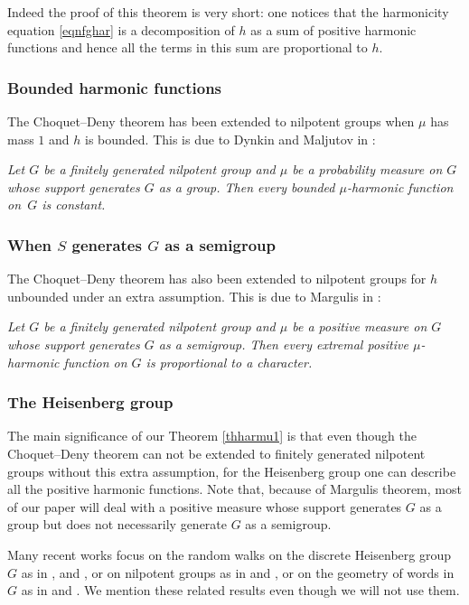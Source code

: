 Indeed the proof of this theorem is very short:
one notices that the harmonicity equation \eqref{eqnfghar}
is a decomposition of $h$ as a sum of positive harmonic functions
and hence all the terms in this sum are proportional to $h$.

\subsubsection{Bounded harmonic functions}
The Choquet--Deny theorem has been extended to nilpotent
groups when $\mu$ has mass $1$
and $h$ is bounded. This is due to
Dynkin and Maljutov in \cite{DynkinMaljutov61}:

\emph{Let $G$ be a finitely generated nilpotent group
and $\mu$ be a probability measure on $G$
whose support generates $G$ as a group.
Then every bounded $\mu$-harmonic
function on~$G$ is constant.}

\subsubsection{When $S$ generates $G$ as a semigroup}
The Choquet--Deny theorem has also been extended to nilpotent
groups for $h$ unbounded under an extra assumption.
This is due to Margulis in \cite{Margulis66}:

\emph{Let $G$ be a finitely generated nilpotent group
and $\mu$ be a positive measure on $G$
whose support generates $G$ \emph{as a semigroup}.
Then every extremal positive $\mu$-harmonic
function on $G$ is proportional to a character.}

\subsubsection{The Heisenberg group}
The main significance of our Theorem \ref{thharmu1} is
that even though the Choquet--Deny theorem can not be
extended to finitely generated nilpotent groups
without this extra assumption, for the Heisenberg group
one can describe all the positive harmonic functions.
Note that, because of Margulis theorem,
most of our paper will deal
with a positive measure whose support
generates $G$ as a group but does not
necessarily generate $G$ as a semigroup.

Many recent works focus
on the random walks on the discrete Heisenberg group
$G$ as in
\cite{Breuillard05},
\cite{DiaconisHough15} and
\cite{GollSchmidtVerbitskiy16},
or on nilpotent groups as in \cite{Breuillard10}
and \cite{Guivarch71},
or on the geometry of words in $G$ as in
\cite{LindSchmidt15} and \cite{VershikMalyutin18}.
We mention these related results
even though we will not use them.

